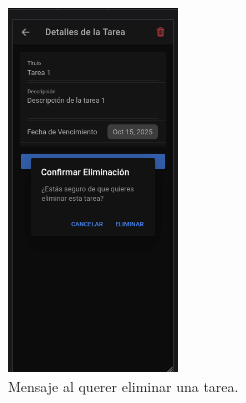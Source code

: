 \documentclass{article}
\begin{document}
\begin{figure}[htbp]
\centering
\includegraphics[width=0.4\textwidth]{captura_eliminar.png}
\caption{Mensaje al querer eliminar una tarea.}
\end{figure}
\end{document}
